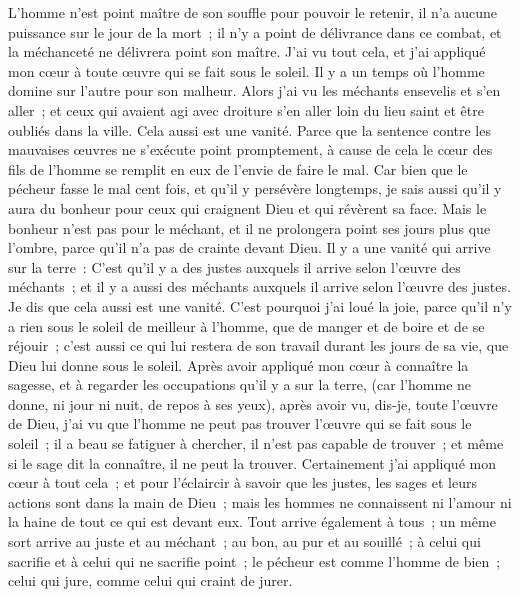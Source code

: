 \begin{multicols}{2}
L'homme n'est point maître de son souffle pour pouvoir le retenir, il n'a aucune puissance sur le jour de la mort~; il n'y a point de délivrance dans ce combat, et la méchanceté ne délivrera point son maître.
J'ai vu tout cela, et j'ai appliqué mon cœur à toute œuvre qui se fait sous le soleil. Il y a un temps où l'homme domine sur l'autre pour son malheur.
Alors j'ai vu les méchants ensevelis et s'en aller~; et ceux qui avaient agi avec droiture s'en aller loin du lieu saint et être oubliés dans la ville. Cela aussi est une vanité.
Parce que la sentence contre les mauvaises œuvres ne s'exécute point promptement, à cause de cela le cœur des fils de l'homme se remplit en eux de l'envie de faire le mal.
Car bien que le pécheur fasse le mal cent fois, et qu'il y persévère longtemps, je sais aussi qu'il y aura du bonheur pour ceux qui craignent Dieu et qui révèrent sa face.
Mais le bonheur n'est pas pour le méchant, et il ne prolongera point ses jours plus que l'ombre, parce qu'il n'a pas de crainte devant Dieu.
Il y a une vanité qui arrive sur la terre~: C'est qu'il y a des justes auxquels il arrive selon l'œuvre des méchants~; et il y a aussi des méchants auxquels il arrive selon l'œuvre des justes. Je dis que cela aussi est une vanité.
C'est pourquoi j'ai loué la joie, parce qu'il n'y a rien sous le soleil de meilleur à l'homme, que de manger et de boire et de se réjouir~; c'est aussi ce qui lui restera de son travail durant les jours de sa vie, que Dieu lui donne sous le soleil. 
Après avoir appliqué mon cœur à connaître la sagesse, et à regarder les occupations qu'il y a sur la terre, (car l'homme ne donne, ni jour ni nuit, de repos à ses yeux), 
après avoir vu, dis-je, toute l'œuvre de Dieu, j'ai vu que l'homme ne peut pas trouver l'œuvre qui se fait sous le soleil~; il a beau se fatiguer à chercher, il n'est pas capable de trouver~; et même si le sage dit la connaître, il ne peut la trouver.
\VerseOne{}Certainement j'ai appliqué mon cœur à tout cela~; et pour l'éclaircir à savoir que les justes, les sages et leurs actions sont dans la main de Dieu~; mais les hommes ne connaissent ni l'amour ni la haine de tout ce qui est devant eux. 
Tout arrive également à tous~; un même sort arrive au juste et au méchant~; au bon, au pur et au souillé~; à celui qui sacrifie et à celui qui ne sacrifie point~; le pécheur est comme l'homme de bien~; celui qui jure, comme celui qui craint de jurer. 

\end{multicols}
